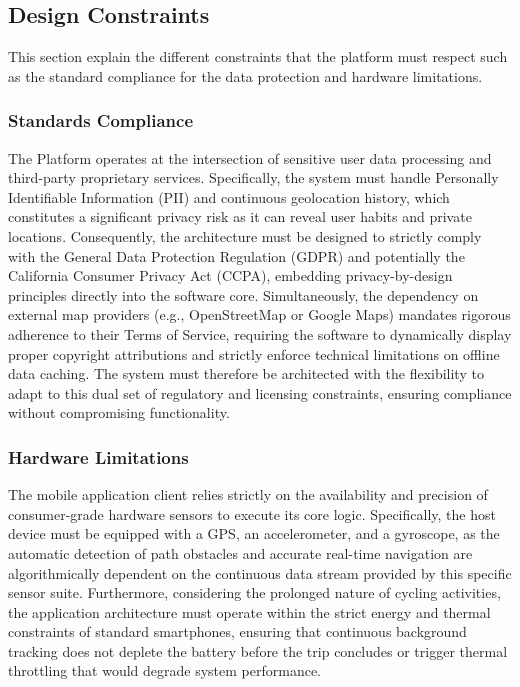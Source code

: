 \subsection{Design Constraints}
This section explain the different constraints that the platform must respect such as the standard compliance for the data protection and hardware limitations.

\subsubsection{Standards Compliance}

The Platform operates at the intersection of sensitive user data processing and third-party proprietary services. Specifically, the system must handle Personally Identifiable Information (PII) and continuous geolocation history, which constitutes a significant privacy risk as it can reveal user habits and private locations. Consequently, the architecture must be designed to strictly comply with the General Data Protection Regulation (GDPR) and potentially the California Consumer Privacy Act (CCPA), embedding privacy-by-design principles directly into the software core. Simultaneously, the dependency on external map providers (e.g., OpenStreetMap or Google Maps) mandates rigorous adherence to their Terms of Service, requiring the software to dynamically display proper copyright attributions and strictly enforce technical limitations on offline data caching. The system must therefore be architected with the flexibility to adapt to this dual set of regulatory and licensing constraints, ensuring compliance without compromising functionality.

\subsubsection{Hardware Limitations}
The mobile application client relies strictly on the availability and precision of consumer-grade hardware sensors to execute its core logic. Specifically, the host device must be equipped with a GPS, an accelerometer, and a gyroscope, as the automatic detection of path obstacles and accurate real-time navigation are algorithmically dependent on the continuous data stream provided by this specific sensor suite. Furthermore, considering the prolonged nature of cycling activities, the application architecture must operate within the strict energy and thermal constraints of standard smartphones, ensuring that continuous background tracking does not deplete the battery before the trip concludes or trigger thermal throttling that would degrade system performance.

